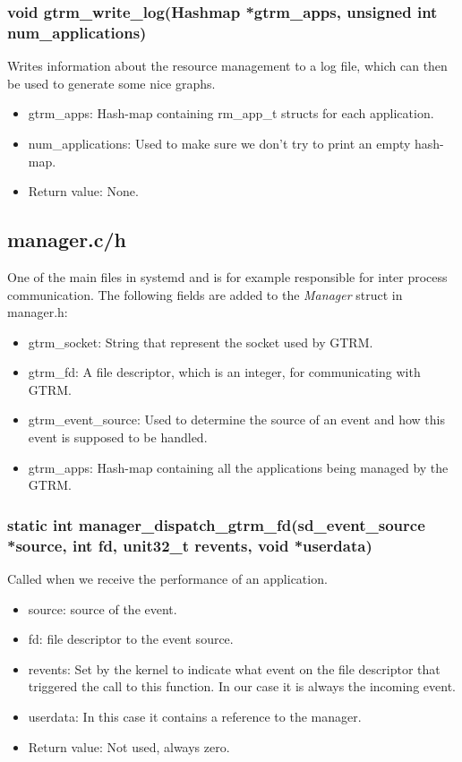 \documentclass[nobiblatex]{LTHthesis}
\begin{document}
\subsubsection{void gtrm\_write\_log(Hashmap *gtrm\_apps, unsigned int num\_applications)}
Writes information about the resource management to a log file, which can then be used to generate some nice graphs.
\begin{itemize} 
\item gtrm\_apps: Hash-map containing rm\_app\_t structs for each application.
\item num\_applications: Used to make sure we don't try to print an empty hash-map.
\item Return value: None.
\end{itemize}

\subsection{manager.c/h}
One of the main files in systemd and is for example responsible for inter process communication. The following fields are added to the \emph{Manager} struct in manager.h:
\begin{itemize}
\item gtrm\_socket: String that represent the socket used by GTRM.
\item gtrm\_fd: A file descriptor, which is an integer, for communicating with GTRM.
\item gtrm\_event\_source: Used to determine the source of an event and how this event is supposed to be handled.
\item gtrm\_apps: Hash-map containing all the applications being managed by the GTRM.
\end{itemize}



\subsubsection{static int manager\_dispatch\_gtrm\_fd(sd\_event\_source *source, int fd, unit32\_t revents, void *userdata)}
Called when we receive the performance of an application.
\begin{itemize}
\item source: source of the event.
\item fd: file descriptor to the event source.
\item revents: Set by the kernel to indicate what event on the file descriptor that triggered the call to this function. In our case it is always the incoming event.
\item userdata: In this case it contains a reference to the manager.
\item Return value: Not used, always zero.
\end{itemize}
\end{document}

